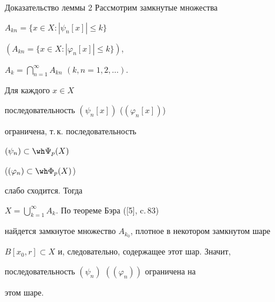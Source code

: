 \begin{pf*}{Доказательство леммы 2} Рассмотрим замкнутые множества


$A_{kn} = \{x \in X : |\psi_{n}[x]| \leq k \}$


$(A_{kn} = \{x \in X : |\varphi_{n}[x]| \leq k \})$,


$A_{k} =\bigcap \limits_{n=1}^{\infty}A_{kn}$  $(k, n =1,2,\dotsc )$. 


Для каждого $x \in X$


последовательность $(\psi_{n} [x])$ ($(\varphi _{n} [x])$)


ограничена, т.\,к. последовательность


$(\psi_{n}) \subset \wh \Psi_{p}(X)$


($(\varphi _{n}) \subset \wh \Phi_{p}(X)$)


слабо сходится. Тогда


$X = \bigcup \limits_{k=1}^{\infty}A_{k}$. По теореме Бэра ([5], c.\,83)


найдется замкнутое множество $A_{k_{0}}$, плотное в некотором замкнутом шаре


$B[x_{0},r] \subset X$ и, следовательно, содержащее этот шар. Значит,


последовательность $(\psi_{n})$ $((\varphi _{n}))$ ограничена на


этом шаре.


\end{pf*}






